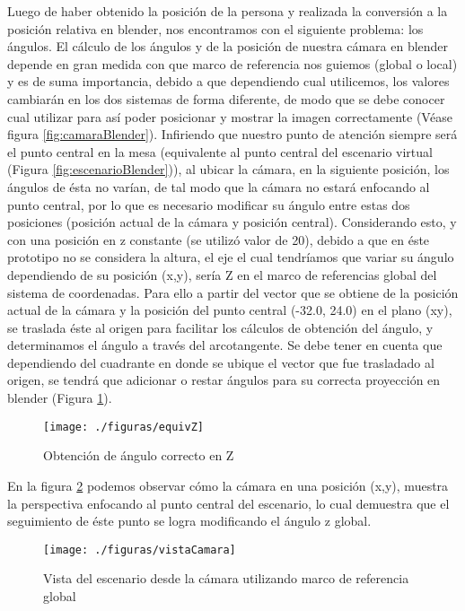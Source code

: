 \documentclass[a4paper,openright,12pt]{report}
\begin{document}
Luego de haber obtenido la posición de la persona y realizada la conversión a la posición relativa en blender, nos encontramos con el siguiente problema: los ángulos. El cálculo de los ángulos y de la posición de nuestra cámara en blender depende en gran medida con que marco de referencia nos guiemos (global o local) y es de suma importancia, debido a que dependiendo cual utilicemos, los valores cambiarán en los dos sistemas de forma diferente, de modo que se debe conocer cual utilizar para así poder posicionar y mostrar la imagen correctamente (Véase figura \ref{fig:camaraBlender}). Infiriendo que nuestro punto de atención siempre será el punto central en la mesa (equivalente al punto central del escenario virtual (Figura \ref{fig:escenarioBlender})), al ubicar la cámara, en la siguiente posición, los ángulos de ésta no varían, de tal modo que la cámara no estará enfocando al punto central, por lo que es necesario modificar su ángulo entre estas dos posiciones (posición actual de la cámara y posición central). Considerando esto, y con una posición en z constante (se utilizó valor de 20), debido a que en éste prototipo no se considera la altura, el eje el cual tendríamos que variar su ángulo dependiendo de su posición (x,y), sería Z en el marco de referencias global del sistema de coordenadas. Para ello a partir del vector que se obtiene de la posición actual de la cámara y la posición del punto central (-32.0, 24.0) en el plano (xy), se traslada éste al origen para facilitar los cálculos de obtención del ángulo, y determinamos el ángulo a través del arcotangente. Se debe tener en cuenta que dependiendo del cuadrante en donde se ubique el vector que fue trasladado al origen, se tendrá que adicionar o restar ángulos para su correcta proyección en blender (Figura \ref{fig:equivZ}).
\begin{figure}[H]
	\centering
	\texttt{[image: ./figuras/equivZ]}
	\caption{Obtención de ángulo correcto en Z} \label{fig:equivZ}
\end{figure}
En la figura \ref{fig:vistaCamara} podemos observar cómo la cámara en una posición (x,y), muestra la perspectiva enfocando al punto central del escenario, lo cual demuestra que el seguimiento de éste punto se logra modificando el ángulo z global.
\begin{figure}[thb]
	\centering
	\texttt{[image: ./figuras/vistaCamara]}
	\caption[Vista del escenario desde la cámara]{Vista del escenario desde la cámara utilizando marco de referencia global} \label{fig:vistaCamara}
\end{figure}\\
\end{document}
